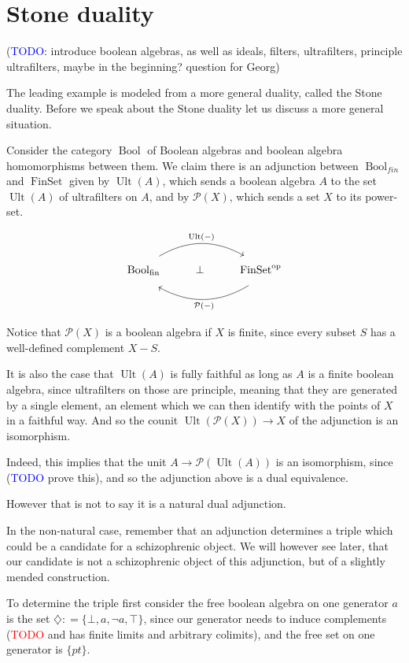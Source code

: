 \documentclass[12pt,a4paper]{article}
\DeclareMathOperator{\Bool}{Bool}
\DeclareMathOperator{\op}{op}
\DeclareMathOperator{\Ult}{Ult}
\DeclareMathOperator{\FinSet}{FinSet}
\begin{document}
\section{Stone duality}

(\textcolor{blue}{TODO}: introduce boolean algebras, as well as ideals, filters, ultrafilters, principle ultrafilters, maybe in the beginning? question for Georg) 


The leading example is modeled from a more general duality, called the Stone duality. Before we speak about the Stone duality let us discuss a more general situation.

Consider the category $\Bool$ of Boolean algebras and boolean algebra homomorphisms between them. We claim there is an adjunction between $\Bool_{fin}$ and $\FinSet$ given by $\Ult(A)$, which sends a boolean algebra $A$ to the set $\Ult(A)$ of ultrafilters on $A$, and by $\mathcal{P}(X)$, which sends a set $X$ to its power-set.

\[\begin{tikzcd}
	\Bool_{\text{fin}} & \bot & \FinSet^{\op}
	\arrow["{\Ult(-)}", shift left=2, bend left, from=1-1, to=1-3]
	\arrow["{\mathcal{P}(-)}", shift left=3, bend left, from=1-3, to=1-1]
\end{tikzcd}\]

Notice that $\mathcal{P}(X)$ is a boolean algebra if $X$ is finite, since every subset $S$ has a well-defined complement $X - S$. 


It is also the case that $\Ult(A)$ is  fully faithful as long as $A$ is a finite boolean algebra, since ultrafilters on those are principle, meaning that they are generated by a single element, an element which we can then identify with the points of $X$ in a faithful way. And so the counit $\Ult(\mathcal{P}(X)) \to X$ of the adjunction is an isomorphism.
 
Indeed, this implies that the unit $A \to \mathcal{P}(\Ult(A))$ is an isomorphism, since (\textcolor{blue}{TODO} prove this), and so the adjunction above is a dual equivalence.

However that is not to say it is a natural dual adjunction. 

In the non-natural case, remember that an adjunction determines a triple which could be a candidate for a schizophrenic object. We will however see later, that our candidate is not a schizophrenic object of this adjunction, but of a slightly mended construction.

To determine the triple first consider the free boolean algebra on one generator $a$ is the set $\diamondsuit : =\{\bot, a, \neg a, \top \}$, since our generator needs to induce complements (\textcolor{red}{TODO} and has finite limits and arbitrary colimits), and the free set on one generator is $\{pt\}$. 
\end{document}

